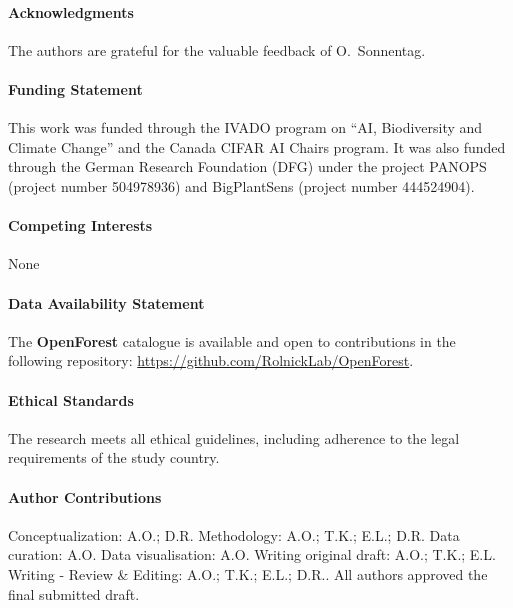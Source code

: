 \documentclass{CUP-JNL-DTM}%
\theoremstyle{definition}
\numberwithin{equation}{section}
\begin{document}
\begin{Backmatter}

\paragraph{Acknowledgments} The authors are grateful for the valuable feedback of O.~Sonnentag.


\paragraph{Funding Statement}
This work was funded through the IVADO program on ``AI, Biodiversity and Climate Change'' and the Canada CIFAR AI Chairs program. 
It was also funded through the German Research Foundation (DFG) under the project PANOPS (project number 504978936) and BigPlantSens (project number 444524904).


\paragraph{Competing Interests}
None

\paragraph{Data Availability Statement}
The \textbf{OpenForest} catalogue is available and open to contributions in the following repository: \url{https://github.com/RolnickLab/OpenForest}.

\paragraph{Ethical Standards}
The research meets all ethical guidelines, including adherence to the legal requirements of the study country.

\paragraph{Author Contributions}
Conceptualization: A.O.; D.R. Methodology: A.O.; T.K.; E.L.; D.R. Data curation: A.O. Data visualisation: A.O. Writing original draft: A.O.; T.K.; E.L. Writing - Review \& Editing: A.O.; T.K.; E.L.; D.R.. All authors approved the final submitted draft.








\end{Backmatter}
\end{document}
